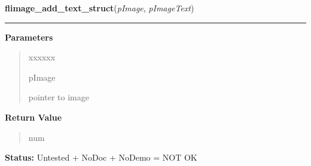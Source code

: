 \hspace{.8\funcindent}\begin{boxedminipage}{\funcwidth}

    \raggedright \textbf{flimage\_add\_text\_struct}(\textit{pImage}, \textit{pImageText})

    \vspace{-1.5ex}

    \rule{\textwidth}{0.5\fboxrule}
\setlength{\parskip}{2ex}
\setlength{\parskip}{1ex}
      \textbf{Parameters}
      \vspace{-1ex}

      \begin{quote}
        \begin{Ventry}{xxxxxx}

          \item[pImage]

          pointer to image

        \end{Ventry}

      \end{quote}

      \textbf{Return Value}
    \vspace{-1ex}

      \begin{quote}
      num

      \end{quote}

\textbf{Status:} Untested + NoDoc + NoDemo = NOT OK



    \end{boxedminipage}

    \label{xformslib:library:flimage_delete_all_text}

    \vspace{0.5ex}

